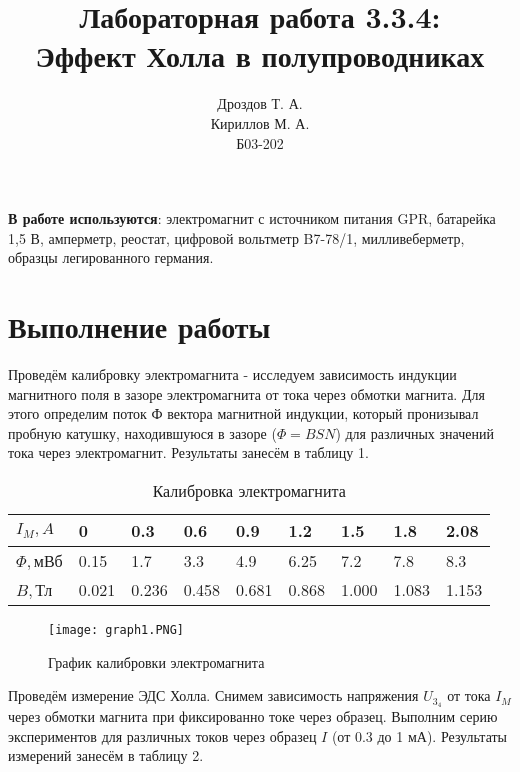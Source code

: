 \documentclass[a4paper]{article}
\title{Лабораторная работа 3.3.4:\\Эффект Холла в полупроводниках}
\author{Дроздов Т. А.\\Кириллов М. А.\\Б03-202}
\date{}
\begin{document}
\maketitle

\textbf{В работе используются}: электромагнит с источником питания GPR, батарейка 1,5 В, амперметр, реостат, цифровой вольтметр B7-78/1, милливеберметр, образцы легированного германия.


\section*{Выполнение работы}


    Проведём калибровку электромагнита - исследуем зависимость индукции магнитного поля в зазоре электромагнита от тока через обмотки магнита. Для этого определим поток Ф вектора магнитной индукции, который пронизывал пробную катушку, находившуюся в зазоре ($\Phi = BSN$) для различных значений тока через электромагнит. Результаты занесём в таблицу 1.
    
    \begin{table}[h]
    \centering
    \begin{center}
    \caption{Калибровка электромагнита}
    \end{center}
    \vspace{0.1cm}
    \label{tab:my_label}
    \begin{tabular}{ |p{1.5cm}||p{0.7cm}|p{0.7cm}|p{0.7cm}|p{0.7cm}|p{0.7cm}|p{0.7cm}|p{0.7cm}|p{0.7cm}|  }
 \hline
$I_M, A$ & 0 & 0.3 & 0.6 & 0.9 & 1.2 & 1.5 & 1.8 & 2.08 \\
 \hline
 $\Phi, $мВб & 0.15 & 1.7 & 3.3 & 4.9 & 6.25 & 7.2 & 7.8 & 8.3\\
 \hline
 $B, $Тл & 0.021 & 0.236 & 0.458 & 0.681 & 0.868 & 1.000 & 1.083 & 1.153\\
 \hline
 
\end{tabular}
\end{table}
    
    \begin{figure}[h]
    \centering
    \texttt{[image: graph1.PNG]}
    \caption{График калибровки электромагнита}
    \label{fig:vac}
\end{figure}
    
     Проведём измерение ЭДС Холла. Снимем зависимость напряжения $U_3_4$ от тока $I_M$ через обмотки магнита при фиксированно токе через образец. Выполним серию экспериментов для различных токов через образец $I$ (от 0.3 до 1 мА). Результаты измерений занесём в таблицу 2.
    
\end{document}
